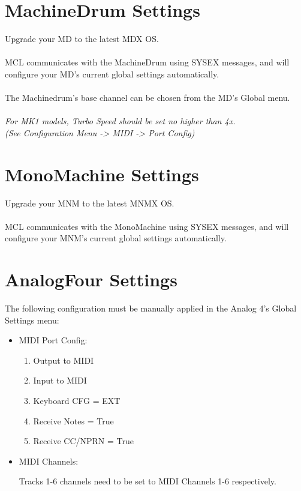 \section{MachineDrum Settings}
Upgrade your MD to the latest MDX OS.\\\\
MCL communicates with the MachineDrum using SYSEX messages, and will configure your MD's current global settings automatically.
\\\\The Machinedrum's base channel can be chosen from the MD's Global menu.\\\\
\textit{For MK1 models, Turbo Speed should be set no higher than 4x.\\(See Configuration Menu -> MIDI -> Port Config)}
\section{MonoMachine Settings}
Upgrade your MNM to the latest MNMX OS.\\\\
MCL communicates with the MonoMachine using SYSEX messages, and will configure your MNM's current global settings automatically.
\section{AnalogFour Settings}

The following configuration must be manually applied in the Analog 4's Global Settings menu:

\begin{itemize}

\item{MIDI Port Config:}
\begin{enumerate}
\item{Output to MIDI}
\item{Input to MIDI}
\item{Keyboard CFG = EXT}
\item{Receive Notes = True}
\item{Receive CC/NPRN = True}
\end{enumerate}
\item{MIDI Channels:}

Tracks 1-6 channels need to be set to MIDI Channels 1-6 respectively.

\end{itemize}
